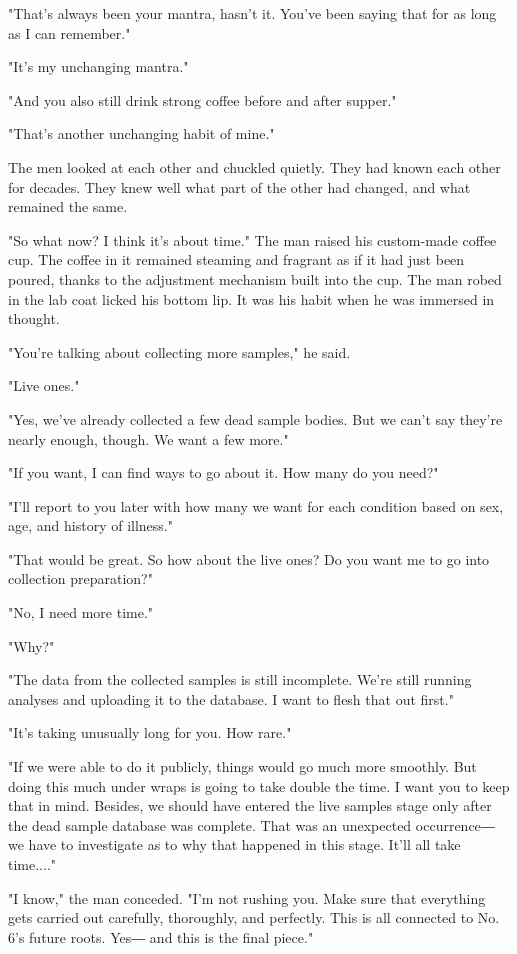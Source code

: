 "That's always been your mantra, hasn't it. You've been saying that for
as long as I can remember."

"It's my unchanging mantra."

"And you also still drink strong coffee before and after supper."

"That's another unchanging habit of mine."

The men looked at each other and chuckled quietly. They had known each
other for decades. They knew well what part of the other had changed,
and what remained the same.

"So what now? I think it's about time." The man raised his custom-made
coffee cup. The coffee in it remained steaming and fragrant as if it had
just been poured, thanks to the adjustment mechanism built into the cup.
The man robed in the lab coat licked his bottom lip. It was his habit
when he was immersed in thought.

"You're talking about collecting more samples," he said.

"Live ones."

"Yes, we've already collected a few dead sample bodies. But we can't say
they're nearly enough, though. We want a few more."

"If you want, I can find ways to go about it. How many do you need?"

"I'll report to you later with how many we want for each condition based
on sex, age, and history of illness."

"That would be great. So how about the live ones? Do you want me to go
into collection preparation?"

"No, I need more time."

"Why?"

"The data from the collected samples is still incomplete. We're still
running analyses and uploading it to the database. I want to flesh that
out first."

"It's taking unusually long for you. How rare."

"If we were able to do it publicly, things would go much more smoothly.
But doing this much under wraps is going to take double the time. I want
you to keep that in mind. Besides, we should have entered the live
samples stage only after the dead sample database was complete. That was
an unexpected occurrence― we have to investigate as to why that happened
in this stage. It'll all take time...."

"I know," the man conceded. "I'm not rushing you. Make sure that
everything gets carried out carefully, thoroughly, and perfectly. This
is all connected to No. 6's future roots. Yes― and this is the final
piece."

